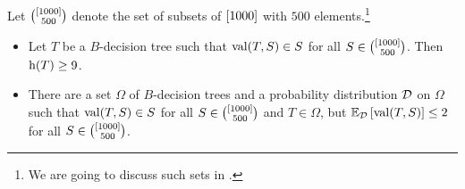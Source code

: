 \begin{theorem}
\label{theorem:guess-one-out-of-many}
  Let $\binom{\range{1000}}{500}$ denote the set of subsets of $\range{1000}$
  with $500$ elements.\footnote{%
    We are going to discuss such sets in .
  }
  \begin{itemize}
    \item Let $T$ be a $B$-decision tree such that $\DTValue{T}{S} \in S$
      for all $S \in \binom{\range{1000}}{500}$. Then $\DTHeight{T} \ge 9$.
    \item There are a set $\Omega$ of $B$-decision trees and a probability
      distribution $\Distribution{D}$ on $\Omega$ such that 
      $\DTValue{T}{S} \in S$ for all $S \in \binom{\range{1000}}{500}$ and 
      $T \in \Omega$, but 
      $\expectation[\Distribution{D}]{\DTValue{T}{S}} \le 2$ for all 
      $S \in \binom{\range{1000}}{500}$.
  \end{itemize}
\end{theorem}
